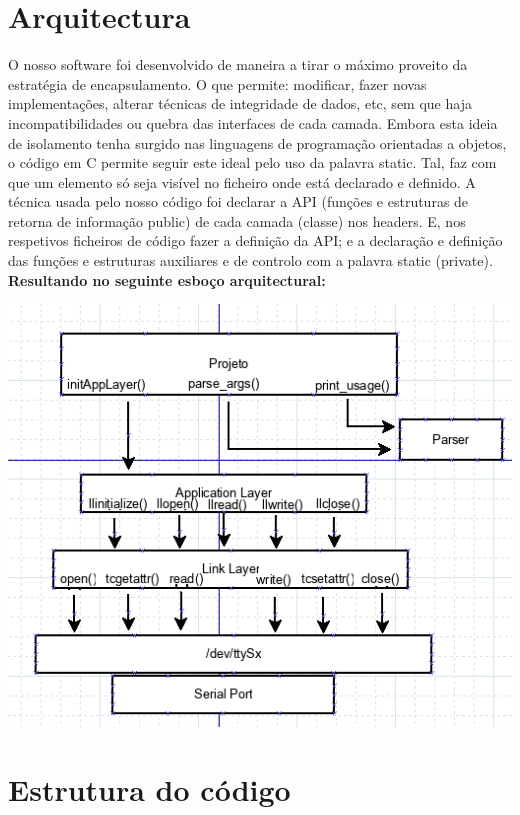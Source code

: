 \documentclass[a4paper]{article}
\begin{document}
\section{Arquitectura}
O nosso software foi desenvolvido de maneira a tirar o máximo proveito da
estratégia de encapsulamento. O que permite: modificar, fazer novas
implementações, alterar técnicas de integridade de dados, etc, sem que haja
incompatibilidades ou quebra das interfaces de cada camada. Embora esta ideia
de isolamento tenha surgido nas linguagens de programação orientadas a objetos,
o código em C permite seguir este ideal pelo uso da palavra static. Tal, faz
com que um elemento só seja visível no ficheiro onde está declarado e definido.
A técnica usada pelo nosso código foi declarar a API (funções e estruturas de
retorna de informação public) de cada camada (classe) nos headers. E, nos
respetivos ficheiros de código fazer a definição da API\@; e a declaração e
definição das funções e estruturas auxiliares e de controlo com a palavra
static (private).
\\\newline\textbf{Resultando no seguinte esboço arquitectural:}\\\newline
\centerline{\includegraphics{API.png}}

\section{Estrutura do código}
\end{document}
